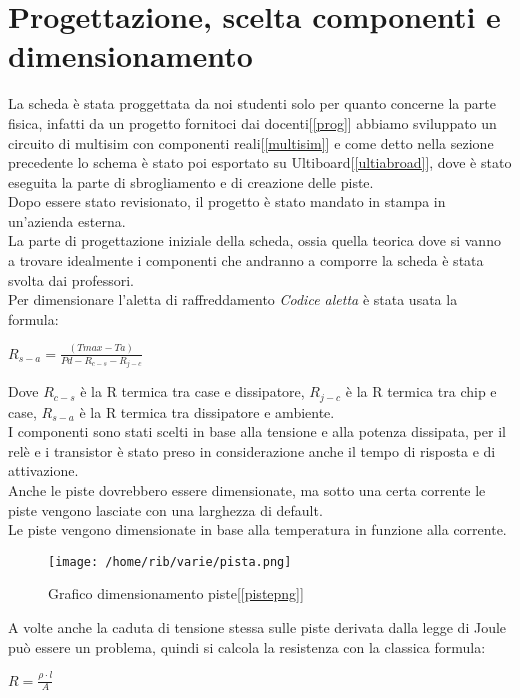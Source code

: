 \documentclass[12pt]{article}
\begin{document}
\section{Progettazione, scelta componenti e dimensionamento}
La scheda è stata proggettata da noi studenti solo per quanto concerne la parte fisica, infatti da un progetto fornitoci dai docenti[\ref{prog}] abbiamo sviluppato un circuito di multisim con 
componenti reali[\ref{multisim}] e come detto nella sezione precedente lo schema è stato poi esportato su Ultiboard[\ref{ultiabroad}], dove è stato eseguita la parte di sbrogliamento e di creazione delle piste.\\
Dopo essere stato revisionato, il progetto è stato mandato in stampa in un'azienda esterna.\\
\vskip 2mm
\noindent
La parte di progettazione iniziale della scheda, ossia quella teorica dove si vanno a trovare idealmente i componenti che andranno a comporre la scheda è stata svolta dai professori.\\
Per dimensionare l'aletta di raffreddamento \textit{Codice aletta} è stata usata la formula:

\begin{center}
$R_{s-a}=\frac{(Tmax-Ta)}{Pd-R_{c-s}-R_{j-c}}$\\
\end{center}
\noindent
Dove \textit{$R_{c-s}$} è la R termica tra case e dissipatore, \textit{$R_{j-c}$} è la R termica tra chip e case, \textit{$R_{s-a}$} è la R termica tra dissipatore e ambiente.\\
I componenti sono stati scelti in base alla tensione e alla potenza dissipata, per il relè e i transistor è stato preso in considerazione anche il tempo di risposta e di attivazione.\\
Anche le piste dovrebbero essere dimensionate, ma sotto una certa corrente le piste vengono lasciate con una larghezza di default.\\ 
Le piste vengono dimensionate in base alla temperatura in funzione alla corrente.\\

\begin{figure}[H]
  \centering
  \texttt{[image: /home/rib/varie/pista.png]}
  \caption{Grafico dimensionamento piste[\ref{pistepng}]}
  \label{lepistelepistelepiste}
\end{figure}
\noindent
A volte anche la caduta di tensione stessa sulle piste derivata dalla legge di Joule può essere un problema, quindi si calcola la resistenza con la classica formula:
\begin{center}
    $\textit{R}=\frac{\rho\cdot\textit{l}}{\textit{A}}$
\end{center}
\end{document}
